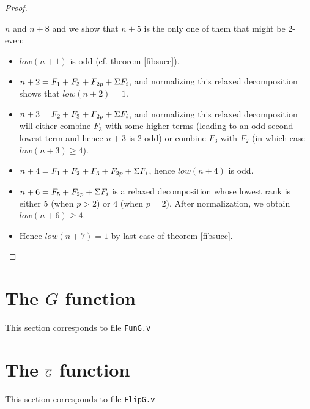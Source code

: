 \documentclass[a4paper,11pt]{article}
\begin{document}
\begin{proof}
\begin{enumerate}
  $n$ and $n+8$ and we show that $n+5$ is the only one of them that
  might be 2-even:
  \begin{itemize}
  \item $low(n+1)$ is odd (cf. theorem \ref{fibsucc}).
  \item $n+2 = F_1+F_3+F_{2p}+\Sigma F_i$, and normalizing this
    relaxed decomposition shows that $low(n+2)=1$.
  \item $n+3 = F_2+F_3+F_{2p}+\Sigma F_i$, and normalizing this
    relaxed decomposition will either combine $F_3$ with some
    higher terms (leading to an odd second-lowest term and
    hence $n+3$ is 2-odd) or combine $F_3$ with $F_2$ (in which
    case $low(n+3)\ge 4$).
  \item $n+4 = F_1+F_2+F_3+F_{2p}+\Sigma F_i$, hence $low(n+4)$ is
    odd.
  \item $n+6 = F_5+F_{2p}+\Sigma F_i$ is a relaxed decomposition
   whose lowest rank is either 5 (when $p>2$) or 4 (when $p=2$).
   After normalization, we obtain $low(n+6)\ge 4$.
  \item Hence $low(n+7)=1$ by last case of theorem \ref{fibsucc}.
  \end{itemize}
\end{enumerate}
\end{proof}




\section{The $G$ function}

This section corresponds to file {\tt FunG.v}


\section{The $\overline{G}$ function}

This section corresponds to file {\tt FlipG.v}
\end{document}
